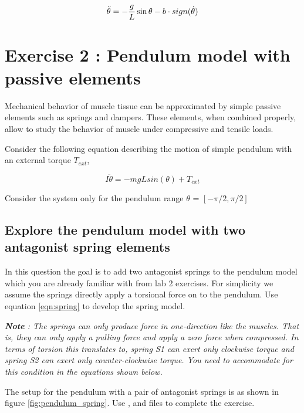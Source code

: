 \documentclass{cmc}
\begin{document}
\begin{equation}
  \label{eq:ode-pendulum-dry}
  \ddot{\theta} = - {g \over L} \sin \theta - b \cdot sign(\dot{\theta})
\end{equation}






\section*{Exercise 2 : Pendulum model with passive elements}
\label{sec:question-1}

Mechanical behavior of muscle tissue can be approximated by simple
passive elements such as springs and dampers. These elements, when
combined properly, allow to study the behavior of muscle under
compressive and tensile loads.

Consider the following equation describing the motion of simple
pendulum with an external torque $T_{ext}$,

\begin{equation}
  \label{eq:pendulum_1}
  I\ddot{\theta} = -mgLsin(\theta) + T_{ext}
\end{equation}


Consider the system only for the pendulum range $\theta$ =
$[-\pi/2, \pi/2]$

\subsection*{Explore the pendulum model with two antagonist spring
  elements}

In this question the goal is to add two antagonist springs to the
pendulum model which you are already familiar with from lab 2
exercises. For simplicity we assume the springs directly apply a
torsional force on to the pendulum.  Use equation \ref{eqn:spring} to
develop the spring model.

\textit{\textbf{Note} : The springs can only produce force in
  one-direction like the muscles.  That is, they can only apply a
  pulling force and apply a zero force when compressed.  In terms of
  torsion this translates to, spring S1 can exert only clockwise
  torque and spring S2 can exert only counter-clockwise torque.  You
  need to accommodate for this condition in the equations shown below.}

The setup for the pendulum with a pair of antagonist springs is as
shown in figure \ref{fig:pendulum_spring}. Use ,
 and  files to
complete the exercise.
\end{document}
